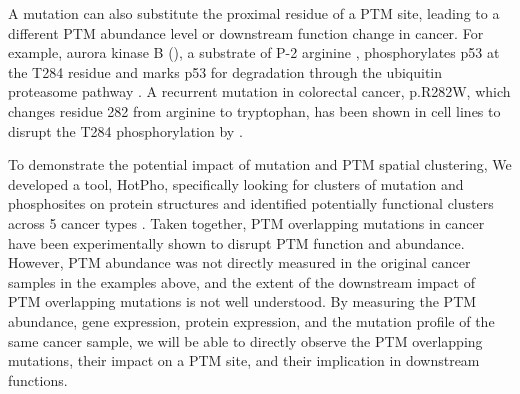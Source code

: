 A mutation can also substitute the proximal residue of a PTM site, leading to a different PTM abundance level or downstream function change in cancer. For example, aurora kinase B (), a substrate of P-2 arginine \cite{endicottja_johnsonln:StructuralBasis2012}, phosphorylates p53 at the T284 residue and marks p53 for degradation through the ubiquitin proteasome pathway \cite{gullycp_leemh:AuroraKinase2012}. A recurrent mutation in colorectal cancer,  p.R282W, which changes residue 282 from arginine to tryptophan, has been shown in cell lines to disrupt the T284 phosphorylation by  \cite{wagiho_badergd:MIMPPredicting2015}.

To demonstrate the potential impact of mutation and PTM spatial clustering, We developed a tool, HotPho, specifically looking for clusters of mutation and phosphosites on protein structures and identified potentially functional clusters across 5 cancer types \cite{huangk_dingl:SpatiallyInteracting2021}. Taken together, PTM overlapping mutations in cancer have been experimentally shown to disrupt PTM function and abundance. However, PTM abundance was not directly measured in the original cancer samples in the examples above, and the extent of the downstream impact of PTM overlapping mutations is not well understood. By measuring the PTM abundance, gene expression, protein expression, and the mutation profile of the same cancer sample, we will be able to directly observe the PTM overlapping mutations, their impact on a PTM site, and their implication in downstream functions.


